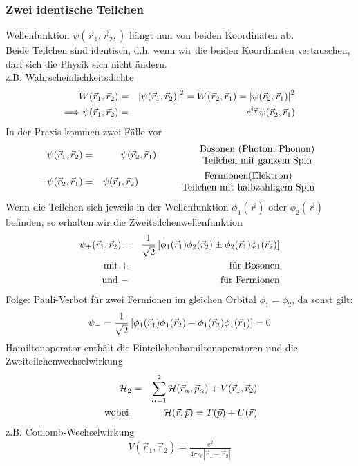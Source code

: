 \subsubsection{Zwei identische Teilchen}
Wellenfunktion $\psi(\vec r_1,\vec r_2,)$ hängt nun von beiden Koordinaten ab.\\
Beide Teilchen sind identisch, d.h. wenn wir die beiden Koordinaten vertauschen, darf sich die Physik sich nicht ändern.\\
z.B. Wahrscheinlichkeitsdichte
\begin{eqnarray*}
W(\vec r_1,\vec r_2)&=& \left |\psi(\vec r_1,\vec r_2)\right|^2 = W(\vec r_2,\vec r_1) = \left |\psi(\vec r_2,\vec r_1)\right|^2\\
\Longrightarrow \psi(\vec r_1,\vec r_2) &=& e^{i\varphi} \psi(\vec r_2,\vec r_1)
\end{eqnarray*}
In der Praxis kommen zwei Fälle vor
\begin{eqnarray*}
\psi(\vec r_1, \vec r_2) \g \psi(\vec r_2,\vec r_1) \qquad\qquad \begin{array}c\text{Bosonen (Photon, Phonon)}\\\text{Teilchen mit ganzem Spin}\end{array}\\
-\psi(\vec r_2,\vec r_1) \g \psi(\vec r_1,\vec r_2) \qquad\qquad \begin{array}c \text{Fermionen(Elektron)}\\\text{Teilchen mit halbzahligem Spin}\end{array}
\end{eqnarray*}
Wenn die Teilchen sich jeweils in der Wellenfunktion $\phi_1(\vec r)$ oder $\phi_2(\vec r)$ befinden, so erhalten wir die Zweiteilchenwellenfunktion
\begin{eqnarray*}
\psi_\pm (\vec r_1,\vec r_2) &=& \frac 1 {\sqrt{2}} \left[\phi_1(\vec r_1)\phi_2(\vec r_2)\pm\phi_2(\vec r_1)\phi_1(\vec r_2)\right]\\
\text{ mit  }&+& \text{für Bosonen}\\
\text{und   }&-&\text{für Fermionen}
\end{eqnarray*}
Folge: Pauli-Verbot für zwei Fermionen im gleichen Orbital $\phi_1 = \phi_2$, da sonst gilt:
\begin{eqnarray*} \psi_- = \frac 1 {\sqrt 2}\left[\phi_1(\vec r_1)\phi_1(\vec r_2) - \phi_1(\vec r_2)\phi_1(\vec r_1) \right] = 0
\end{eqnarray*}
Hamiltonoperator enthält die Einteilchenhamiltonoperatoren und die Zweiteilchenwechselwirkung
\begin{eqnarray*}
\mathcal H_2 &=& \sum \limits_{\alpha=1}^2 \mathcal H(\vec r_\alpha, \vec p_\alpha) + V(\vec r_1, \vec r_2)\\
\text{ wobei  }&{}& \mathcal H(\vec r, \vec p) = T(\vec p) + U(\vec r)
\end{eqnarray*}
z.B. Coulomb-Wechselwirkung
\begin{eqnarray*} V(\vec r_1,\vec r_2) =\frac{e^2}{4\pi\varepsilon_0 |\vec r_1-\vec r_2|}\end{eqnarray*}
